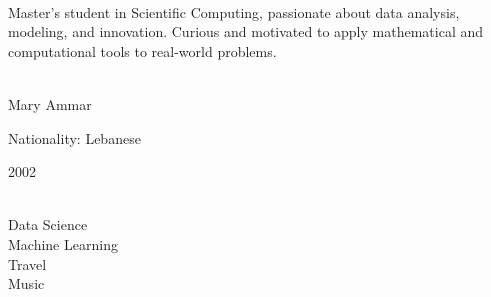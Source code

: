 \documentclass[lighthipster]{simplehipstercv}
\begin{document}
\setlength{\columnsep}{1.5cm}
\begin{paracol}{2}
\raggedright %




\paracolbackgroundoptions



\footnotesize
{\setasidefontcolour
\flushright

\begin{center}
\end{center}

\\[0.5em]

{{\footnotesize
Master's student in Scientific Computing, passionate about data analysis, modeling, and innovation.  
Curious and motivated to apply mathematical and computational tools to real-world problems.
}
}
\bigskip

 \\[0.5em]
Mary Ammar

Nationality: Lebanese 

2002

\bigskip


\\[0.5em]
Data Science\\
Machine Learning\\
Travel\\
Music\\


}
\end{paracol}
\end{document}
